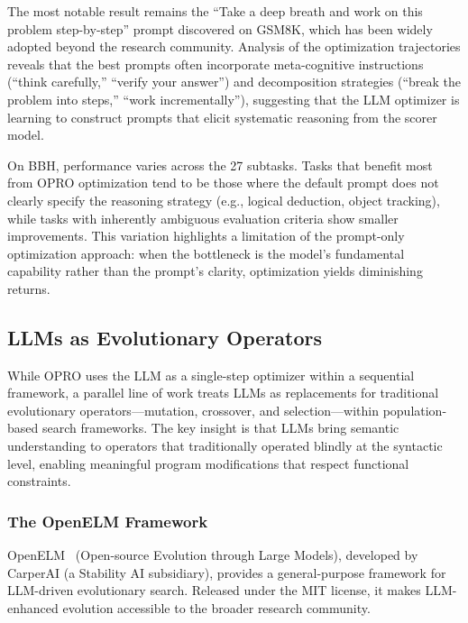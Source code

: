 The most notable result remains the ``Take a deep breath and work on this problem step-by-step'' prompt discovered on GSM8K, which has been widely adopted beyond the research community. Analysis of the optimization trajectories reveals that the best prompts often incorporate meta-cognitive instructions (``think carefully,'' ``verify your answer'') and decomposition strategies (``break the problem into steps,'' ``work incrementally''), suggesting that the LLM optimizer is learning to construct prompts that elicit systematic reasoning from the scorer model.

On BBH, performance varies across the 27 subtasks. Tasks that benefit most from OPRO optimization tend to be those where the default prompt does not clearly specify the reasoning strategy (e.g., logical deduction, object tracking), while tasks with inherently ambiguous evaluation criteria show smaller improvements. This variation highlights a limitation of the prompt-only optimization approach: when the bottleneck is the model's fundamental capability rather than the prompt's clarity, optimization yields diminishing returns.

\subsection{LLMs as Evolutionary Operators}
\label{sec:llm-evolutionary}

While OPRO uses the LLM as a single-step optimizer within a sequential framework, a parallel line of work treats LLMs as replacements for traditional evolutionary operators---mutation, crossover, and selection---within population-based search frameworks. The key insight is that LLMs bring semantic understanding to operators that traditionally operated blindly at the syntactic level, enabling meaningful program modifications that respect functional constraints.

\subsubsection{The OpenELM Framework}

OpenELM~\citep{openelm2023} (Open-source Evolution through Large Models), developed by CarperAI (a Stability AI subsidiary), provides a general-purpose framework for LLM-driven evolutionary search. Released under the MIT license, it makes LLM-enhanced evolution accessible to the broader research community.


